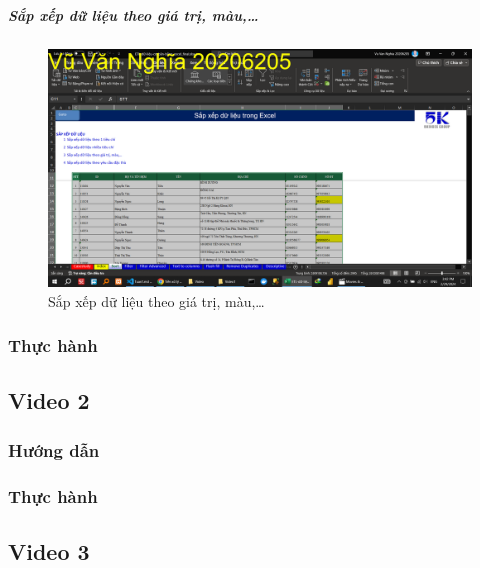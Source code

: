 \documentclass{article}
\begin{document}
\subparagraph{Sắp xếp dữ liệu theo giá trị, màu,\dots}
\begin{figure}[h]
    \centering
    \includegraphics[scale = 0.15]{Video1/HuongDan/1.png}
    \caption{Sắp xếp dữ liệu theo  giá trị, màu,\dots}
\end{figure}












\subsubsection{Thực hành}



\subsection{Video 2}
\subsubsection{Hướng dẫn}

\subsubsection{Thực hành}




\subsection{Video 3}
\end{document}
